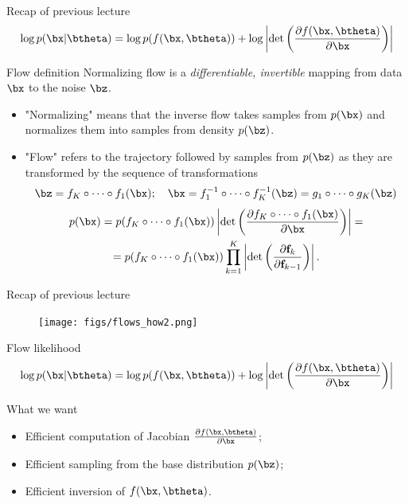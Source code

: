 \begin{frame}{Recap of previous lecture}
	\vspace{-0.3cm}
	\[
		\log p(\bx|\btheta) = \log p(f(\bx, \btheta)) + \log \left|\det \left( \frac{\partial f(\bx, \btheta)}{\partial \bx} \right) \right|
	\]
	\vspace{-0.3cm}
	\begin{block}{Flow definition}
		Normalizing flow is a \textit{differentiable, invertible} mapping from data $\bx$ to the noise $\bz$. 
	\end{block}
	\begin{itemize}
		\item "Normalizing" means that the inverse flow takes samples from $p(\bx)$ and normalizes them into samples from density $p(\bz)$.
		\item "Flow" refers to the trajectory followed by samples from $p(\bz)$ as they are transformed by the sequence of transformations
		\[
		\bz = f_K \circ \dots \circ f_1(\bx); \quad \bx = f_1^{-1} \circ \dots \circ f_K^{-1} (\bz) = g_1 \circ \dots \circ g_K(\bz) 
		\] 
		\begin{multline*}
			p(\bx) = p(f_K \circ \dots \circ f_1(\bx)) \left|\det \left(\frac{\partial f_K \circ \dots \circ f_1(\bx)}{\partial \bx} \right) \right| = \\
			= p(f_K \circ \dots \circ f_1(\bx)) \prod_{k=1}^K \left|\det \left(\frac{\partial \mathbf{f}_k}{\partial \mathbf{f}_{k-1}} \right) \right|.
		\end{multline*}
	\end{itemize}
\end{frame}
\begin{frame}{Recap of previous lecture}
	\begin{figure}
		\texttt{[image: figs/flows\_how2.png]}
	\end{figure}
	\vspace{-0.3cm}
		\begin{block}{Flow likelihood}
			\vspace{-0.3cm}
			\[
			\log p(\bx|\btheta) = \log p(f(\bx, \btheta)) + \log \left|\det \left( \frac{\partial f(\bx, \btheta)}{\partial \bx} \right) \right|
			\]
			\vspace{-0.5cm}
		\end{block}
		\begin{block}{What we want}
			\begin{itemize}
				\item Efficient computation of Jacobian $\frac{\partial f(\bx, \btheta)}{\partial \bx}$;
				\item Efficient sampling from the base distribution $p(\bz)$;
				\item Efficient inversion of $f(\bx, \btheta)$.
			\end{itemize}
			
		\end{block}
\end{frame}

